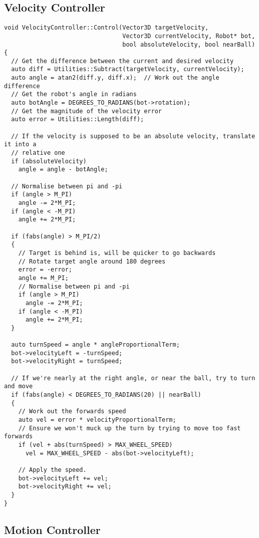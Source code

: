 \lstset{language=C++}

\subsection{Velocity Controller\label{app:velControl}}

\begin{lstlisting}
void VelocityController::Control(Vector3D targetVelocity, 
                                 Vector3D currentVelocity, Robot* bot, 
                                 bool absoluteVelocity, bool nearBall)
{
  // Get the difference between the current and desired velocity
  auto diff = Utilities::Subtract(targetVelocity, currentVelocity); 
  auto angle = atan2(diff.y, diff.x);  // Work out the angle difference
  // Get the robot's angle in radians
  auto botAngle = DEGREES_TO_RADIANS(bot->rotation);
  // Get the magnitude of the velocity error 
  auto error = Utilities::Length(diff); 

  // If the velocity is supposed to be an absolute velocity, translate it into a
  // relative one
  if (absoluteVelocity) 
    angle = angle - botAngle;

  // Normalise between pi and -pi
  if (angle > M_PI)
    angle -= 2*M_PI;
  if (angle < -M_PI)
    angle += 2*M_PI;

  if (fabs(angle) > M_PI/2) 
  {
    // Target is behind is, will be quicker to go backwards
    // Rotate target angle around 180 degrees
    error = -error;
    angle += M_PI;
    // Normalise between pi and -pi
    if (angle > M_PI)
      angle -= 2*M_PI;
    if (angle < -M_PI)
      angle += 2*M_PI;
  }

  auto turnSpeed = angle * angleProportionalTerm;
  bot->velocityLeft = -turnSpeed;
  bot->velocityRight = turnSpeed;

  // If we're nearly at the right angle, or near the ball, try to turn and move
  if (fabs(angle) < DEGREES_TO_RADIANS(20) || nearBall) 
  {
    // Work out the forwards speed
    auto vel = error * velocityProportionalTerm;
    // Ensure we won't muck up the turn by trying to move too fast forwards
    if (vel + abs(turnSpeed) > MAX_WHEEL_SPEED)
      vel = MAX_WHEEL_SPEED - abs(bot->velocityLeft);

    // Apply the speed.
    bot->velocityLeft += vel;
    bot->velocityRight += vel;
  }
}
\end{lstlisting}

\subsection{Motion Controller\label{app:motionControl}}

